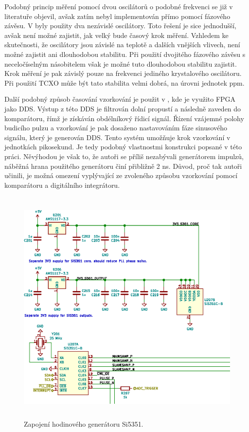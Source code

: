 Podobný princip měření pomocí dvou oscilátorů o podobné frekvenci se již v literatuře objevil, avšak zatím nebyl implementován přímo pomocí fázového závěsu. V \cite{vernierreflectometer} byly použity dva nezávislé oscilátory. Toto řešení je sice jednodušší, avšak není možné zajistit, jak velký bude časový krok měření. Vzhledem ke skutečnosti, že oscilátory jsou závislé na teplotě a dalších vnějších vlivech, není možné zajistit ani dlouhodobou stabilitu. Při použití dvojitého fázového závěsu s neceločíselným násobitelem však je možné tuto dlouhodobou stabilitu zajistit. Krok měření je pak závislý pouze na frekvenci jediného krystalového oscilátoru. Při použití \acrshort{TCXO} může být tato stabilita velmi dobrá, na úrovni jednotek \si{ppm}.

Další podobný způsob časování vzorkování je použit v \cite{ddsfpgareflectometer}, kde je využito \acrshort{FPGA} jako \acrshort{DDS}. Výstup z této \acrshort{DDS} je filtrován dolní propustí a následně zaveden do komparátoru, římž je získáván obdélníkový řídicí signál. Řízení vzájemné polohy budicího pulzu a vzorkování je pak dosaženo nastavováním fáze sinusového signálu, který je generován \acrshort{DDS}. Tento systém umožňuje krok vzorkování v jednotkách pikosekund. Je tedy podobný vlastnostmi konstrukci popsané v této práci. Něvýhodou je však to, že autoři se příliš nezabývali generátorem impulzů, náběžná hrana použitého generátoru činí přibližně 2 \si{ns}. Důvod, proč tak autoři učinili, je možná omezení vyplývající ze zvoleného způsobu vzorkování pomocí komparátoru a digitálního integrátoru.

\begin{figure}[hbtp]
\includegraphics[width=\textwidth,height=12cm,keepaspectratio]{images/timing_section.eps}\caption{Zapojení hodinového generátoru Si5351.}\label{timing_section_schematic}
\end{figure}	

